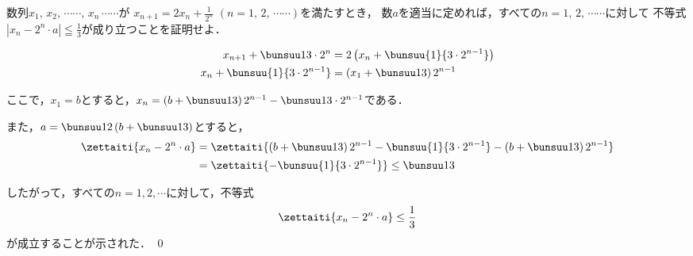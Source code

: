 \begin{problem}
  数列$x_1, \, x_2, \, \cdots\cdots, \, x_n \, \cdots\cdots$が
$\displaystyle x_{n+1}=2x_n+\frac{1}{2^n}$ $(n=1, \, 2, \, \cdots\cdots)$を満たすとき，
数$a$を適当に定めれば，すべての$n=1, \, 2, \, \cdots\cdots$に対して
不等式$\displaystyle|x_n-2^n \cdot a|\leqq\frac{1}{3}$が成り立つことを証明せよ．
\end{problem}


\begin{align*}
  x_{n+1} + \bunsuu1{3\cdot 2^n} &= 2\left(x_n + \bunsuu{1}{3 \cdot 2^{n-1}}\right) \\
  x_n + \bunsuu{1}{3\cdot 2^{n-1}} &= \left(x_1 + \bunsuu13\right) 2^{n-1}
\end{align*}

ここで，$x_1 = b$とすると，$x_n = \left(b + \bunsuu13\right) 2^{n-1} - \bunsuu1{3\cdot 2^{n-1}}$である．

また，$a = \bunsuu12 \left(b + \bunsuu13\right)$とすると，
\begin{align*}
  \zettaiti{x_n - 2^n \cdot a} &=
  \zettaiti{\left(b + \bunsuu13\right) 2^{n-1} - \bunsuu{1}{3\cdot 2^{n-1}} - \left(b + \bunsuu13\right) 2^{n-1}} \\
  &=\zettaiti{- \bunsuu{1}{3\cdot 2^{n-1}}} \leq \bunsuu13
\end{align*}

したがって，すべての$n = 1,2,\cdots$に対して，不等式
\[\zettaiti{x_n - 2^n \cdot a} \leq \frac13 \]
が成立することが示された．
\qed
